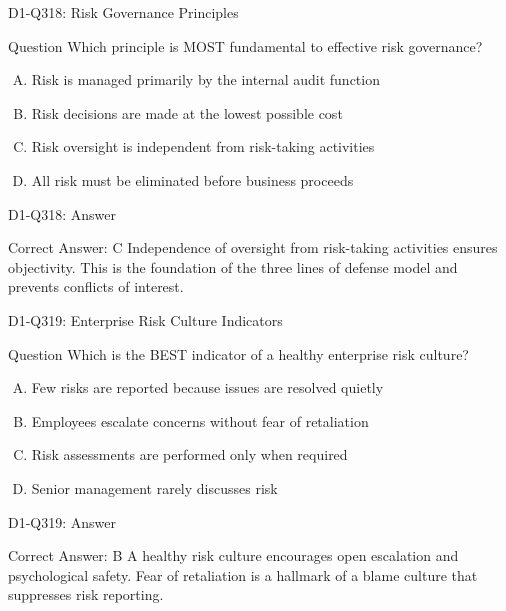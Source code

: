 \documentclass{beamer}
\begin{document}
\begin{frame}{D1-Q318: Risk Governance Principles}
	\begin{block}{Question}
		Which principle is MOST fundamental to effective risk governance?
	\end{block}
	\begin{enumerate}[(A)]
		\item Risk is managed primarily by the internal audit function
		\item Risk decisions are made at the lowest possible cost
		\item Risk oversight is independent from risk-taking activities
		\item All risk must be eliminated before business proceeds
	\end{enumerate}
\end{frame}
\begin{frame}{D1-Q318: Answer}
	\begin{block}{Correct Answer: C}
		Independence of oversight from risk-taking activities ensures objectivity. This is the foundation of the three lines of defense model and prevents conflicts of interest.
	\end{block}
\end{frame}

\begin{frame}{D1-Q319: Enterprise Risk Culture Indicators}
	\begin{block}{Question}
		Which is the BEST indicator of a healthy enterprise risk culture?
	\end{block}
	\begin{enumerate}[(A)]
		\item Few risks are reported because issues are resolved quietly
		\item Employees escalate concerns without fear of retaliation
		\item Risk assessments are performed only when required
		\item Senior management rarely discusses risk
	\end{enumerate}
\end{frame}
\begin{frame}{D1-Q319: Answer}
	\begin{block}{Correct Answer: B}
		A healthy risk culture encourages open escalation and psychological safety. Fear of retaliation is a hallmark of a blame culture that suppresses risk reporting.
	\end{block}
\end{frame}
\end{document}
